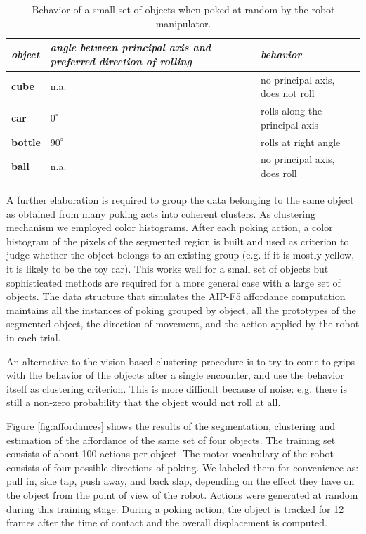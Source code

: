 \begin{table}[htbp]
\begin{center}
\begin{tabular}{|p{2cm}|p{3.5cm}|p{5cm}|}
\hline
{\it object} & {\it angle between principal axis and preferred direction of rolling} &  {\it behavior} \\ \hline\hline
{\bf cube} & n.a. & no principal axis, does not roll\\ \hline
{\bf car} & $0^\circ$ & rolls along the principal axis\\ \hline
{\bf bottle} &  $90^\circ$ & rolls at right angle\\ \hline
{\bf ball} &  n.a. & no principal axis, does roll\\ \hline
\end{tabular}
\caption{
\label{tab:affordances}
%
Behavior of a small set of objects when poked at random by the robot manipulator.
%
}
\end{center}
\end{table}

A further elaboration is required to group the data belonging to the same
object as obtained from many poking acts into coherent clusters. As clustering 
mechanism we employed color histograms. After each poking action, a color histogram 
of the pixels of the segmented region is built and used as criterion 
to judge whether the object belongs to an existing group (e.g. if it
is mostly yellow, it is likely to be the toy car). This works well
for a small set of objects but sophisticated methods are 
required for a more general case with a large set of objects. 
The data structure that simulates the AIP-F5 affordance computation maintains all 
the instances of poking grouped by object, all the prototypes of the segmented object,
the direction of movement, and the action applied by the robot in each trial.

An alternative to the vision-based clustering procedure is to try to come 
to grips with the behavior of the objects after a single encounter, and use 
the behavior itself as clustering criterion. This is more difficult because 
of noise: e.g. there is still a non-zero probability that the object would 
not roll at all.

Figure \ref{fig:affordances} shows the results of the segmentation, clustering
and estimation of the affordance of the same set of four objects. The training set
consists of about 100 actions per object. The motor vocabulary of the robot
consists of four possible directions of poking. We labeled them for convenience
as: pull in, side tap, push away, and back slap, depending on the effect they
have on the object from the point of view of the robot. Actions were generated
at random during this training stage. During a poking action, the object is
tracked for 12 frames after the time of contact and the overall displacement is
computed. 

